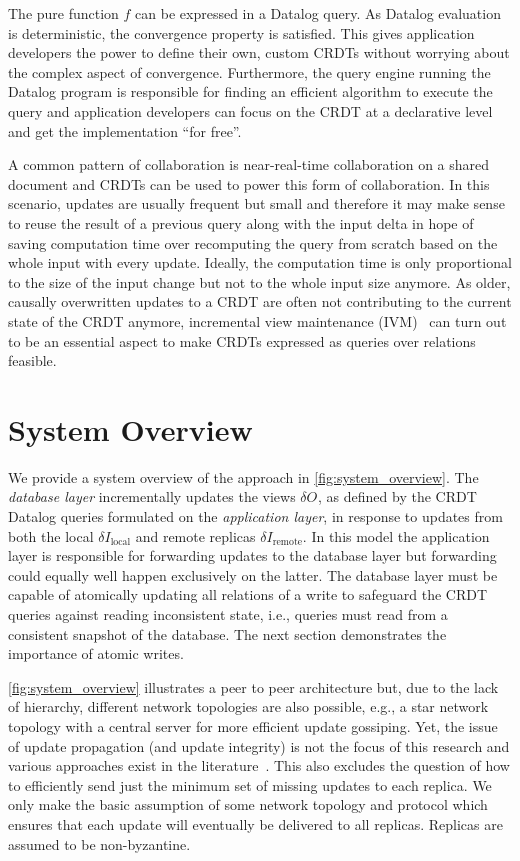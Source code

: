 \documentclass{article}
\newcommand{\deltaI}[1]{\(\delta I_{\text{#1}}\)}
\newcommand{\deltaO}[1][]{\(\delta O_{\text{#1}}\)}
\begin{document}
The pure function \( f \) can be expressed in a Datalog query.
As Datalog evaluation is deterministic, the convergence property is satisfied.
This gives application developers the power to define their own, custom CRDTs
without worrying about the complex aspect of convergence.
Furthermore, the query engine running the Datalog program is responsible
for finding an efficient algorithm to execute the query and application developers
can focus on the CRDT at a declarative level and get the implementation ``for free''.

A common pattern of collaboration is near-real-time collaboration on a shared
document and CRDTs can be used to power this form of collaboration.
In this scenario, updates are usually frequent but small and therefore it
may make sense to reuse the result of a previous query along with the input
delta in hope of saving computation time over recomputing the query from scratch
based on the whole input with every update.
Ideally, the computation time is only proportional to the size of the input
change but not to the whole input size anymore.
As older, causally overwritten updates to a CRDT are often not contributing
to the current state of the CRDT anymore, incremental view
maintenance (IVM)~\cite{mcsherry2013differential, budiu2022dbsp, budiu2024dbsp}
can turn out to be an essential aspect to make CRDTs expressed as
queries over relations feasible.

\section{System Overview}
\label{sec:system_overview}

We provide a system overview of the approach in \autoref{fig:system_overview}.
The \emph{database layer} incrementally updates the views \deltaO{},
as defined by the CRDT Datalog queries formulated on the \emph{application layer},
in response to updates from both the local \deltaI{local} and remote replicas
\deltaI{remote}.
In this model the application layer is responsible for forwarding updates
to the database layer but forwarding could equally well happen exclusively
on the latter.
The database layer must be capable of atomically updating all relations
of a write to safeguard the CRDT queries against reading inconsistent
state, i.e., queries must read from a consistent snapshot of the database.
The next section demonstrates the importance of atomic writes.

\autoref{fig:system_overview} illustrates a peer to peer architecture
but, due to the lack of hierarchy, different network topologies are also possible,
e.g., a star network topology with a central server for more efficient update
gossiping.
Yet, the issue of update propagation (and update integrity) is not the focus
of this research and various approaches exist in the literature~\cite{
	auvolat2019merkle, sanjuan2020merkle, kleppmann2024bluesky,
	kleppmann2022making}.
This also excludes the question of how to efficiently send just the minimum
set of missing updates to each replica.
We only make the basic assumption of some network topology and protocol
which ensures that each update will eventually be delivered to all replicas.
Replicas are assumed to be non-byzantine.
\end{document}
